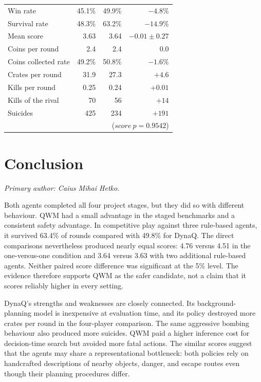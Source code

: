 \documentclass[article, 10pt]{IEEEtran}
\begin{document}
\begin{table}[t]
\begin{tabular}{lrrr}
    \quad Win rate           & 45.1\%  & 49.9\%  & $-4.8\%$ \\
    \quad Survival rate      & 48.3\% & 63.2\% & $-14.9\%$ \\
    \quad Mean score         & 3.63 & 3.64 & $-0.01 \pm 0.27$ \\
    \quad Coins per round    & 2.4  & 2.4  & $0.0$ \\
    \quad Coins collected rate  & 49.2\%  & 50.8\%  & $-1.6\%$ \\
    \quad Crates per round   & 31.9 & 27.3 & $+4.6$ \\
    \quad Kills per round    & 0.25 & 0.24 & $+0.01$ \\
    \quad Kills of the rival & 70   & 56   & $+14$ \\
    \quad Suicides           & 425  & 234  & $+191$ \\
    \quad                    & \multicolumn{3}{r}{($score\ p = 0.9542$)} \\
    \bottomrule
  \end{tabular}
\end{table}





\section{Conclusion}\label{sec:7_conclusion}

\textit{Primary author: Caius Mihai Hetko.}

Both agents completed all four project stages, but they did so with different behaviour. QWM had a small advantage in the staged benchmarks and a consistent safety advantage. In competitive play against three rule-based agents, it survived 63.4\% of rounds compared with 49.8\% for DynaQ. The direct comparisons nevertheless produced nearly equal scores: 4.76 versus 4.51 in the one-versus-one condition and 3.64 versus 3.63 with two additional rule-based agents. Neither paired score difference was significant at the 5\% level. The evidence therefore supports QWM as the safer candidate, not a claim that it scores reliably higher in every setting.

DynaQ's strengths and weaknesses are closely connected. Its background-planning model is inexpensive at evaluation time, and its policy destroyed more crates per round in the four-player comparison. The same aggressive bombing behaviour also produced more suicides. QWM paid a higher inference cost for decision-time search but avoided more fatal actions. The similar scores suggest that the agents may share a representational bottleneck: both policies rely on handcrafted descriptions of nearby objects, danger, and escape routes even though their planning procedures differ.
\end{document}
